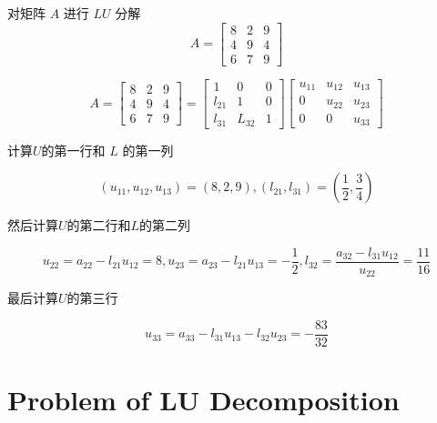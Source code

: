\begin{example}
    对矩阵 $ A $ 进行 $ L U $ 分解
    $$
        A=\left[\begin{array}{lll}
                8 & 2 & 9 \\
                4 & 9 & 4 \\
                6 & 7 & 9
            \end{array}\right]
    $$


    $$ A=\left[\begin{array}{lll}8 & 2 & 9 \\ 4 & 9 & 4 \\ 6 & 7 & 9\end{array}\right]=\left[\begin{array}{ccc}1 & 0 & 0 \\ l_{21} & 1 & 0 \\ l_{31} & L_{32} & 1\end{array}\right]\left[\begin{array}{ccc}u_{11} & u_{12} & u_{13} \\ 0 & u_{22} & u_{23} \\ 0 & 0 & u_{33}\end{array}\right] $$

    计算$U$的第一行和 $ L $ 的第一列

    $$ \left(u_{11}, u_{12}, u_{13}\right)=(8,2,9) , \left(l_{21}, l_{31}\right)=\left(\frac{1}{2}, \frac{3}{4}\right) $$

    然后计算$U$的第二行和$L$的第二列

    $$ u_{22}=a_{22}-l_{21} u_{12}=8 ,
        u_{23}=a_{23}-l_{21} u_{13}=-\frac{1}{2} , l_{32}=\frac{a_{32}-l_{31} u_{12}}{u_{22}}=\frac{11}{16} $$


    最后计算$U$的第三行

    $$ u_{33}=a_{33}-l_{31}  u_{13}-l_{32} u_{23}=-\frac{83}{32} $$

\end{example}

\section{Problem of LU Decomposition}


